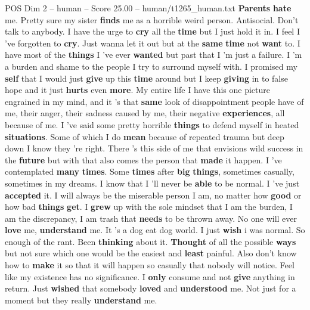 \begin{textsample}{POS Dim 2 – human – Score 25.00 – human/t1265\_human.txt}  \label{ex:f2_pos_022}
\textbf{Parents} \textbf{hate} me.
Pretty sure my sister \textbf{finds} me as a horrible weird person.
Antisocial.
Don't talk to anybody.
I have the urge to \textbf{cry} all the \textbf{time} but I just hold it in.
I feel I ’ve forgotten to \textbf{cry}.
Just wanna let it out but at the \textbf{same} \textbf{time} not \textbf{want} to.
I have most of the \textbf{things} I ’ve ever \textbf{wanted} but past that I ’m just a failure.
I ’m a burden and shame to the people I try to surround myself with.
I promised my \textbf{self} that I would just \textbf{give} up this \textbf{time} around but I keep \textbf{giving} in to false hope and it just \textbf{hurts} even \textbf{more}.
My entire life I have this one picture engrained in my mind, and it ’s that \textbf{same} look of disappointment people have of me, their anger, their sadness caused by me, their negative \textbf{experiences}, all because of me.
I ’ve said some pretty horrible \textbf{things} to defend myself in heated \textbf{situations}.
Some of which I do \textbf{mean} because of repeated trauma but deep down I know they ’re right.
There ’s this side of me that envisions wild success in the \textbf{future} but with that also comes the person that \textbf{made} it happen.
I ’ve contemplated \textbf{many} \textbf{times}.
Some \textbf{times} after \textbf{big} \textbf{things}, sometimes casually, sometimes in my dreams.
I know that I ’ll never be \textbf{able} to be normal.
I ’ve just \textbf{accepted} it.
I will always be the miserable person I am, no matter how \textbf{good} or how bad \textbf{things} \textbf{get}.
I \textbf{grew} up with the sole mindset that I am the burden, I am the discrepancy, I am trash that \textbf{needs} to be thrown away.
No one will ever \textbf{love} me, \textbf{understand} me.
It ’s a dog eat dog world.
I just \textbf{wish} i was normal.
So enough of the rant.
Been \textbf{thinking} about it. \textbf{Thought} of all the possible \textbf{ways} but not sure which one would be the easiest and \textbf{least} painful.
Also don't know how to \textbf{make} it so that it will happen so casually that nobody will notice.
Feel like my existence has no significance.
I \textbf{only} consume and not \textbf{give} anything in return.
Just \textbf{wished} that somebody \textbf{loved} and \textbf{understood} me.
Not just for a moment but they really \textbf{understand} me.

\end{textsample}

